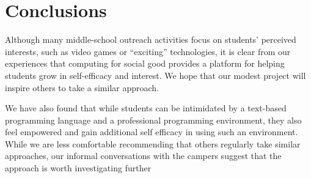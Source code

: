 \section{Conclusions}

Although many middle-school outreach activities focus on students'
perceived interests, such as video games or ``exciting'' technologies,
it is clear from our experiences that computing for social good
provides a platform for helping students grow in self-efficacy and
interest.  We hope that our modest project will inspire others to
take a similar approach.

We have also found that while students can be intimidated by a text-based
programming language and a professional programming environment, they also
feel empowered and gain additional self efficacy in using such an environment.
While we are less comfortable recommending that others regularly take similar
approaches, our informal conversations with the campers suggest that the
approach is worth investigating further
